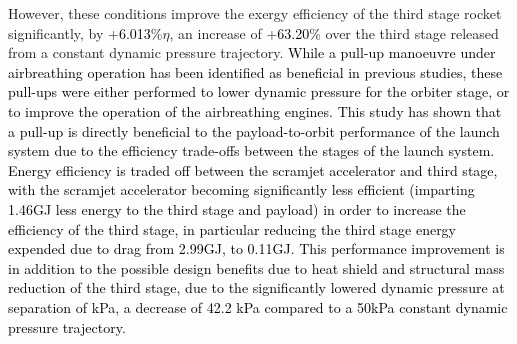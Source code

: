   However, these conditions improve the exergy efficiency of the third stage rocket significantly, by +\textcolor{black}{6.013}\%$\eta$, an increase of +\textcolor{black}{63.20}\% over the third stage released from a constant dynamic pressure trajectory. \textcolor{black}{While a pull-up manoeuvre under airbreathing operation has been identified as beneficial in previous studies\cite{Wilhite1991,Bradford2002,Fujikawa2017}, these pull-ups were either performed to lower dynamic pressure for the orbiter stage\cite{Wilhite1991,Bradford2002}, or to improve the operation of the airbreathing engines\cite{Fujikawa2017}. This study has shown that a pull-up is directly beneficial to the payload-to-orbit performance of the launch system due to the efficiency trade-offs between the stages of the launch system. Energy efficiency is traded off between the scramjet accelerator and third stage, with the scramjet accelerator becoming significantly less efficient (imparting 1.46GJ less energy to the third stage and payload) in order to increase the efficiency of the third stage, in particular reducing the third stage energy expended due to drag from 2.99GJ, to 0.11GJ. This performance improvement is in addition to the possible design benefits due to heat shield and structural mass reduction of the third stage, due to the significantly lowered dynamic pressure at separation of \secondthirdSeparationqStandardNoReturn kPa, a decrease of 42.2 kPa compared to a 50kPa constant dynamic pressure trajectory.}


